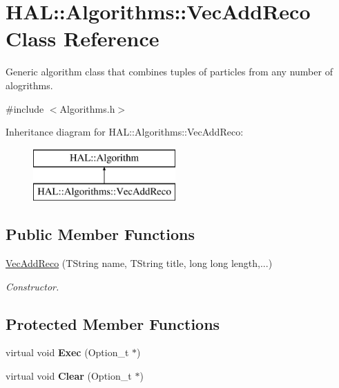 \hypertarget{class_h_a_l_1_1_algorithms_1_1_vec_add_reco}{\section{H\+A\+L\+:\+:Algorithms\+:\+:Vec\+Add\+Reco Class Reference}
\label{class_h_a_l_1_1_algorithms_1_1_vec_add_reco}
}


Generic algorithm class that combines tuples of particles from any number of alogrithms.  




{\ttfamily \#include $<$Algorithms.\+h$>$}

Inheritance diagram for H\+A\+L\+:\+:Algorithms\+:\+:Vec\+Add\+Reco\+:\begin{figure}[H]
\begin{center}
\leavevmode
\includegraphics[height=2.000000cm]{class_h_a_l_1_1_algorithms_1_1_vec_add_reco}
\end{center}
\end{figure}
\subsection*{Public Member Functions}
\begin{DoxyCompactItemize}
\item 
\hyperlink{class_h_a_l_1_1_algorithms_1_1_vec_add_reco_a50faa627aa37f90ac35eccb3f24fb851}{Vec\+Add\+Reco} (T\+String name, T\+String title, long long length,...)
\begin{DoxyCompactList}\small\item\em Constructor. \end{DoxyCompactList}\end{DoxyCompactItemize}
\subsection*{Protected Member Functions}
\begin{DoxyCompactItemize}
\item 
\hypertarget{class_h_a_l_1_1_algorithms_1_1_vec_add_reco_a63f7458fec37ae553418b15a375dafa0}{virtual void {\bfseries Exec} (Option\+\_\+t $\ast$)}\label{class_h_a_l_1_1_algorithms_1_1_vec_add_reco_a63f7458fec37ae553418b15a375dafa0}

\item 
\hypertarget{class_h_a_l_1_1_algorithms_1_1_vec_add_reco_afcf9f83e8165c1cbd7a193ab8f9c8445}{virtual void {\bfseries Clear} (Option\+\_\+t $\ast$)}\label{class_h_a_l_1_1_algorithms_1_1_vec_add_reco_afcf9f83e8165c1cbd7a193ab8f9c8445}

\end{DoxyCompactItemize}
